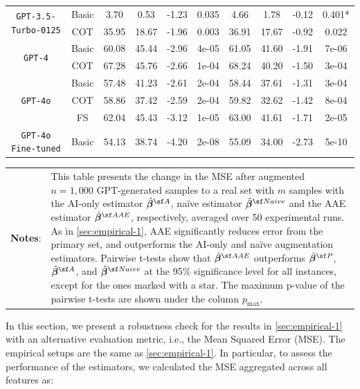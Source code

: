 \begin{table}[!ht]
{\begin{tabular}{cccccccccc}
\multirow{2}{*}{\texttt{GPT-3.5-Turbo-0125}} & Basic & 3.70 & 0.53 & -1.23 & 0.035 & 4.66 & 1.78 & -0.12 & 0.401* \\
 & COT & 35.95 & 18.67 & -1.96 & 0.003 & 36.91 & 17.67 & -0.92 & 0.022 \\
\multirow{2}{*}{\texttt{GPT-4}} & Basic & 60.08 & 45.44 & -2.96 & 4e-05 & 61.05 & 41.60 & -1.91 & 7e-06 \\
 & COT & 67.28 & 45.76 & -2.66 & 1e-04 & 68.24 & 40.20 & -1.50 & 3e-04 \\
\multirow{3}{*}{\texttt{GPT-4o}} & Basic & 57.48 & 41.23 & -2.61 & 2e-04 & 58.44 & 37.61 & -1.31 & 3e-04 \\
 & COT & 58.86 & 37.42 & -2.59 & 2e-04 & 59.82 & 32.62 & -1.42 & 8e-04 \\
 & FS & 62.04 & 45.43 & -3.12 & 1e-05 & 63.00 & 41.61 & -1.71 & 2e-05 \\
\texttt{GPT-4o Fine-tuned} & Basic & 54.13 & 38.74 & -4.20 & 2e-08 & 55.09 & 34.00 & -2.73 & 5e-10
\\\hline\hline
\end{tabular} 
\begin{minipage}{15.5cm}
    \footnotesize
    \vspace{3pt}
    \begin{tabular}{p{1cm} p{14cm}}
         \textbf{Notes}: & \setlength{\baselineskip}{1.2\baselineskip} 
    This table presents the change in the MSE after augmented $n=1,000$ GPT-generated samples to a real set with $m$ samples with the AI-only estimator $\hat{\betavec}^{\sf A}$, na\"ive estimator $\hat{\betavec}^{\sf Naive}$ and the AAE estimator $\hat{\betavec}^{\sf AAE}$, respectively, averaged over 50 experimental runs. As in \cref{sec:empirical-1}, AAE significantly reduces error from the primary set, and outperforms the AI-only and na\"ive augmentation estimators. Pairwise t-tests show that $\hat{\betavec}^{\sf AAE}$ outperforms $\hat{\betavec}^{\sf P}$, $\hat{\betavec}^{\sf A}$, and $\hat{\betavec}^{\sf Naive}$ at the 95\% significance level for all instances, except for the ones marked with a star. The maximum p-value of the pairwise t-tests are shown under the column $p_{\max}$.
    \end{tabular}
  \end{minipage}
}
\end{table}
In this section, we present a robustness check for the results in \cref{sec:empirical-1} with an alternative evaluation metric, i.e., the Mean Squared Error (MSE). The empirical setups are the same as \cref{sec:empirical-1}. 
In particular, to assess the performance of the estimators, we calculated the MSE aggregated across all features as:
